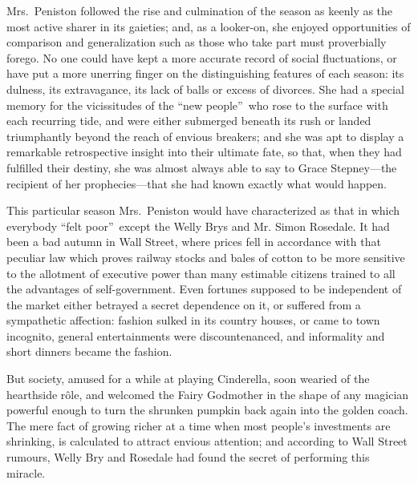 \documentclass[12pt,a4paper]{book}
\begin{document}
Mrs.\ Peniston followed the rise and culmination of the season as
keenly as the most active sharer in its gaieties; and, as a
looker-on, she enjoyed opportunities of comparison and
generalization such as those who take part must proverbially
forego. No one could have kept a more accurate record of social
fluctuations, or have put a more unerring finger on the
distinguishing features of each season: its dulness, its
extravagance, its lack of balls or excess of divorces. She had a
special memory for the vicissitudes of the ``new people''\ who rose
to the surface with each recurring tide, and were either
submerged beneath its rush or landed triumphantly beyond the
reach of envious breakers; and she was apt to display a
remarkable retrospective insight into their ultimate fate, so
that, when they had fulfilled their destiny, she was almost
always able to say to Grace Stepney---the recipient of her
prophecies---that she had known exactly what would happen.





This particular season Mrs.\ Peniston would have characterized as
that in which everybody ``felt poor''\ except the Welly Brys and Mr.
Simon Rosedale. It had been a bad autumn in Wall Street, where
prices fell in accordance with that peculiar law which proves
railway stocks and bales of cotton to be more sensitive to the
allotment of executive power than many estimable citizens trained
to all the advantages of self-government. Even fortunes supposed
to be independent of the market either betrayed a secret
dependence on it, or suffered from a sympathetic affection: 
fashion sulked in its country houses, or came to town incognito,
general entertainments were discountenanced, and informality and
short dinners became the fashion.





But society, amused for a while at playing Cinderella, soon
wearied of the hearthside r\^{o}le, and welcomed the Fairy Godmother
in the shape of any magician powerful enough to turn the shrunken
pumpkin back again into the golden coach. The mere fact of
growing richer at a time when most people's investments are
shrinking, is calculated to attract envious attention; and
according to Wall Street rumours, Welly Bry and Rosedale had
found the secret of performing this miracle.
\end{document}
